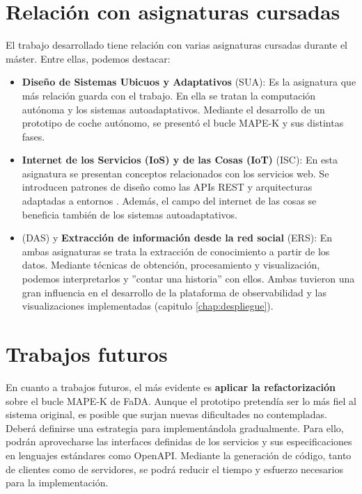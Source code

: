\section{Relación con asignaturas cursadas}

El trabajo desarrollado tiene relación con varias asignaturas cursadas durante el máster. Entre ellas, podemos destacar:

\begin{itemize}
  \item \textbf{Diseño de Sistemas Ubicuos y Adaptativos} (SUA): Es la asignatura que más relación guarda con el trabajo. En ella se tratan la computación autónoma y los sistemas autoadaptativos. Mediante el desarrollo de un prototipo de coche autónomo, se presentó el bucle MAPE-K y sus distintas fases.

  \item \textbf{Internet de los Servicios (IoS) y de las Cosas (IoT)} (ISC): En esta asignatura se presentan conceptos relacionados con los servicios web. Se introducen patrones de diseño como las APIs REST y arquitecturas adaptadas a entornos . Además, el campo del internet de las cosas se beneficia también de los sistemas autoadaptativos. \cite{savaglioAgentbasedInternetThings2020}

  \item \textbf{} (DAS) y \textbf{Extracción de información desde la red social} (ERS): En ambas asignaturas se trata la extracción de conocimiento a partir de los datos. Mediante técnicas de obtención, procesamiento y visualización, podemos interpretarlos y ''contar una historia'' con ellos. Ambas tuvieron una gran influencia en el desarrollo de la plataforma de observabilidad y las visualizaciones implementadas (capitulo \ref{chap:despliegue}).

\end{itemize}

\section{Trabajos futuros}

En cuanto a trabajos futuros, el más evidente es \textbf{aplicar la refactorización} sobre el bucle MAPE-K  de FaDA. Aunque el prototipo pretendía ser lo más fiel al sistema original, es posible que surjan nuevas dificultades no contempladas. Deberá definirse una estrategia para implementándola gradualmente. Para ello, podrán aprovecharse las interfaces definidas de los servicios y sus especificaciones en lenguajes estándares como OpenAPI. Mediante la generación de código, tanto de clientes como de servidores, se podrá reducir el tiempo y esfuerzo necesarios para la implementación.

